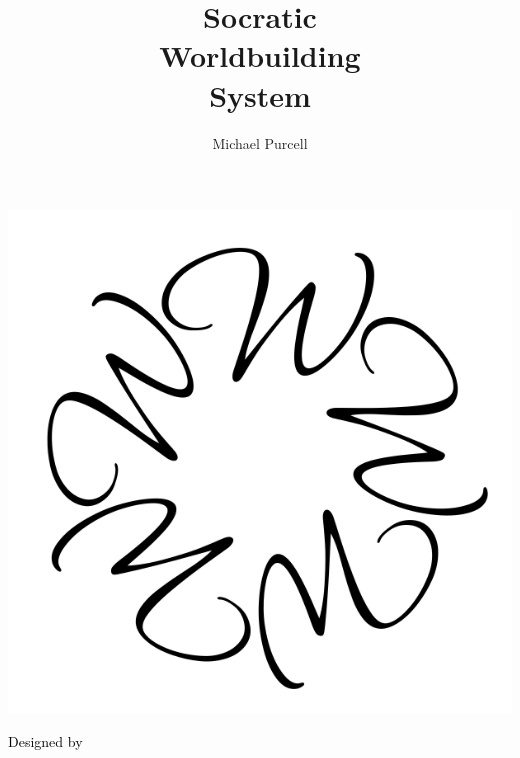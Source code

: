 \documentclass[12pt, a5paper, parskip=half-, footheight=1.4cm]{scrartcl}
\title{\phantom{g}Socratic\phantom{g}\\[0.075ex]Worldbuilding\\[0.075ex]System}
\author{Michael Purcell}
\begin{document}
%
%
%		
%
%
%
%
%
%		

\begin{titlepage}
	\makeatletter
	\thispagestyle{plain}
		\enlargethispage{2.5\baselineskip} %
		
         \setmainfont[Scale=4]{URW Classico-Bold}
	    \centering{\@title}

		\vfill

		\includegraphics[scale=1.1]{sws_logo.pdf}

		\vfill
		
		\setmainfont{URW Classico}\Large{{\textcolor{black}{Designed by \@author}}}
		\makeatother
\end{titlepage}
\end{document}
